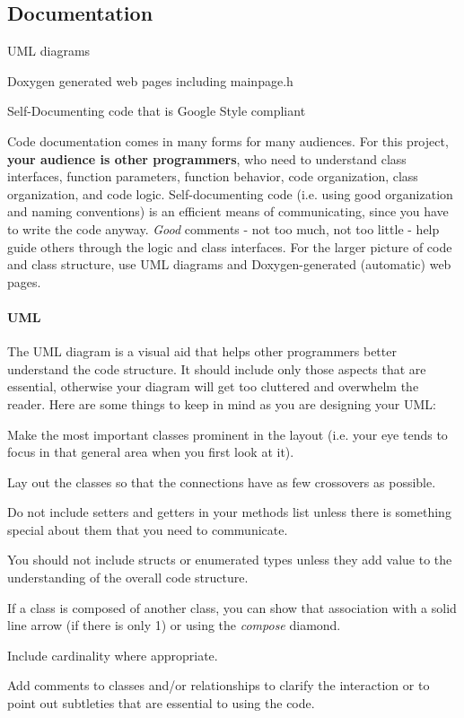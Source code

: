 \subsection*{Documentation}


\begin{DoxyItemize}
\item U\+ML diagrams
\item Doxygen generated web pages including mainpage.\+h
\item Self-\/\+Documenting code that is Google Style compliant
\end{DoxyItemize}

Code documentation comes in many forms for many audiences. For this project, {\bfseries your audience is other programmers}, who need to understand class interfaces, function parameters, function behavior, code organization, class organization, and code logic. Self-\/documenting code (i.\+e. using good organization and naming conventions) is an efficient means of communicating, since you have to write the code anyway. {\itshape Good} comments -\/ not too much, not too little -\/ help guide others through the logic and class interfaces. For the larger picture of code and class structure, use U\+ML diagrams and Doxygen-\/generated (automatic) web pages.

\paragraph*{U\+ML}

The U\+ML diagram is a visual aid that helps other programmers better understand the code structure. It should include only those aspects that are essential, otherwise your diagram will get too cluttered and overwhelm the reader. Here are some things to keep in mind as you are designing your U\+ML\+:


\begin{DoxyItemize}
\item Make the most important classes prominent in the layout (i.\+e. your eye tends to focus in that general area when you first look at it).
\item Lay out the classes so that the connections have as few crossovers as possible.
\item Do not include setters and getters in your methods list unless there is something special about them that you need to communicate.
\item You should not include structs or enumerated types unless they add value to the understanding of the overall code structure.
\item If a class is composed of another class, you can show that association with a solid line arrow (if there is only 1) or using the {\itshape compose} diamond.
\item Include cardinality where appropriate.
\item Add comments to classes and/or relationships to clarify the interaction or to point out subtleties that are essential to using the code.
\end{DoxyItemize}

